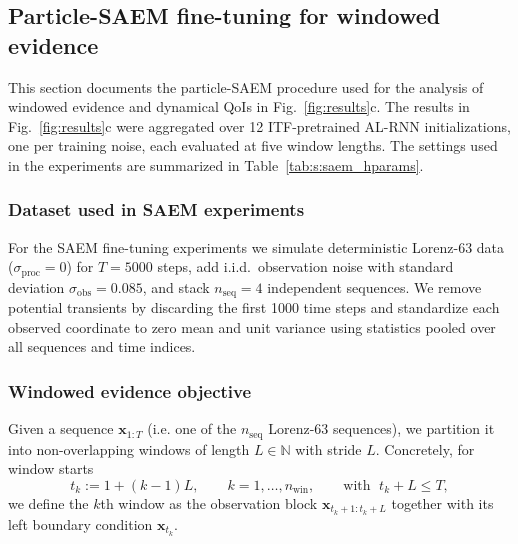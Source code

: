 \documentclass[twoside]{article}
\theoremstyle{plain}
\theoremstyle{definition}
\theoremstyle{remark}
\begin{document}
\subsection{Particle-SAEM fine-tuning for windowed evidence}
\label{sec:s:saem_details}
This section documents the particle-SAEM procedure used for the analysis of windowed evidence and dynamical QoIs in Fig.~\ref{fig:results}c. The results in Fig.~\ref{fig:results}c were aggregated over 12 ITF-pretrained AL-RNN initializations, one per training noise, each evaluated at five window lengths. The settings used in the experiments are summarized in Table~\ref{tab:s:saem_hparams}.

\subsubsection{Dataset used in SAEM experiments}
For the SAEM fine-tuning experiments we simulate deterministic Lorenz-63 data ($\sigma_{\mathrm{proc}}=0$) for $T=5000$ steps, add i.i.d.\ observation noise with standard deviation $\sigma_{\mathrm{obs}}=0.085$, and stack $n_{\mathrm{seq}}=4$ independent sequences.
We remove potential transients by discarding the first 1000 time steps and standardize each observed coordinate to zero mean and unit variance using statistics pooled over all sequences and time indices.

\subsubsection{Windowed evidence objective}
Given a sequence $\bm x_{1:T}$ (i.e. one of the $n_{\mathrm{seq}}$ Lorenz-63 sequences), we partition it into non-overlapping windows of length $L\in\mathbb N$ with stride $L$.
Concretely, for window starts
\begin{equation}
t_k := 1+(k-1)L,\qquad k=1,\dots,n_{\mathrm{win}},\qquad \text{with }\; t_k+L\le T,
\end{equation}
we define the $k$th window as the observation block $\bm x_{t_k+1:t_k+L}$ together with its left boundary condition $\bm x_{t_k}$.
\end{document}
